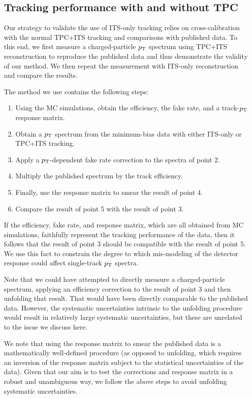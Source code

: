 \subsection{Tracking performance with and without TPC}
\label{sec:closurewithdata}
Our strategy to validate the use of ITS-only tracking relies on cross-calibration with the normal TPC+ITS tracking and comparisons with published data. To this end, we first measure a charged-particle $p_{\mathrm{T}}$ spectrum using TPC+ITS reconstruction to reproduce the published data and thus demonstrate the validity of our method. We then repeat the measurement with ITS-only reconstruction and compare the results.

The method we use contains the following steps: 
\begin{enumerate}
\item Using the MC simulations, obtain the efficiency, the fake rate, and a track-$p_{\mathrm{T}}$ response matrix.
\item Obtain a $p_{\mathrm{T}}$ spectrum from the minimum-bias data with either ITS-only or TPC+ITS tracking. 
\item Apply a $p_{\mathrm{T}}$-dependent fake rate correction to the spectra of point 2. 
\item Multiply the published spectrum by the track efficiency. 
\item Finally, use the response matrix to smear the result of point 4.
\item Compare the result of point 5 with the result of point 3. 
\end{enumerate}

If the efficiency, fake rate, and response matrix, which are all obtained from MC simulations, faithfully represent the tracking performance of the data, then it follows that the result of point 3 should be compatible with the result of point 5. We use this fact to constrain the degree to which mis-modeling of the detector response could affect single-track $p_{\mathrm{T}}$ spectra.

Note that we could have attempted to directly measure a charged-particle spectrum, applying an efficiency correction to the result of point 3 and then unfolding that result. That would have been directly comparable to the published data. However, the systematic uncertainties intrinsic to the unfolding procedure would result in relatively large systematic uncertainties, but these are unrelated to the issue we discuss here. 

We note that using the response matrix to smear the published data is a mathematically well-defined procedure (as opposed to unfolding, which requires an inversion of the response matrix subject to the statistical uncertainties of the data). Given that our aim is to test the corrections and response matrix in a robust and unambiguous way, we follow the above steps to avoid unfolding systematic uncertainties.

